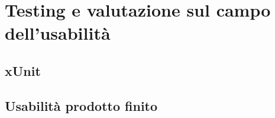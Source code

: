 \chapter{Testing e valutazione sul campo dell'usabilità}
\raggedright{\section{xUnit}}
\raggedright{\section{Usabilità prodotto finito}}

